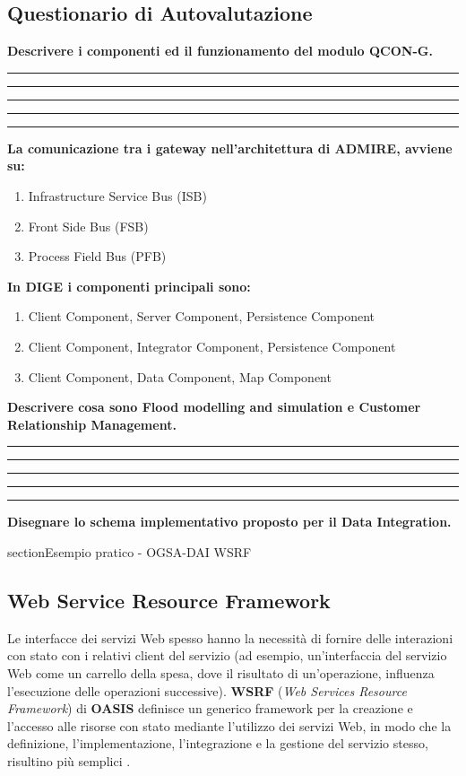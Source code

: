 \documentclass[11pt]{article}
\newcommand{\voceU}[1]{%
	\item #1\dotfill\Square%
}
\begin{document}
\newpage

\subsection{Questionario di Autovalutazione}
\textbf{Descrivere i componenti ed il funzionamento del modulo QCON-G.}\\[5ex]
\rule[5mm]{\textwidth}{0.1mm} 
\rule[5mm]{\textwidth}{0.1mm} 
\rule[5mm]{\textwidth}{0.1mm} 
\rule[5mm]{\textwidth}{0.1mm} 
\rule[5mm]{\textwidth}{0.1mm} 
\textbf{La comunicazione tra i gateway nell'architettura di ADMIRE, avviene su: }
\begin{enumerate}
	\voceU{Infrastructure Service Bus (ISB)}
	\voceU{Front Side Bus (FSB)}
	\voceU{Process Field Bus (PFB)}\\
\end{enumerate}
\textbf{In DIGE i componenti principali sono:}
\begin{enumerate}
	\voceU{Client Component, Server Component, Persistence Component}
	\voceU{ Client Component, Integrator Component, Persistence Component}
	\voceU{Client Component, Data Component, Map Component}\\
\end{enumerate}
\textbf{Descrivere cosa sono Flood modelling and simulation e Customer Relationship Management.}\\[5ex]
\rule[5mm]{\textwidth}{0.1mm} 
\rule[5mm]{\textwidth}{0.1mm} 
\rule[5mm]{\textwidth}{0.1mm} 
\rule[5mm]{\textwidth}{0.1mm} 
\rule[5mm]{\textwidth}{0.1mm} 
\textbf{Disegnare lo schema implementativo proposto per il Data Integration.}
\newpage


section{Esempio pratico - OGSA-DAI WSRF}
\subsection{Web Service Resource Framework}
Le interfacce dei servizi Web spesso hanno la necessità di fornire delle interazioni con stato con i relativi client del servizio (ad esempio, un'interfaccia del servizio Web come un carrello della spesa, dove il risultato di un'operazione, influenza l'esecuzione delle operazioni successive). \textbf{WSRF} (\emph{Web Services Resource Framework}) di \textbf{OASIS} definisce un generico framework per la creazione e l'accesso alle risorse con stato mediante l'utilizzo dei servizi Web, in modo che la definizione, l'implementazione, l'integrazione e la gestione del servizio stesso, risultino più semplici \cite{ogsadai}.\\
\end{document}
